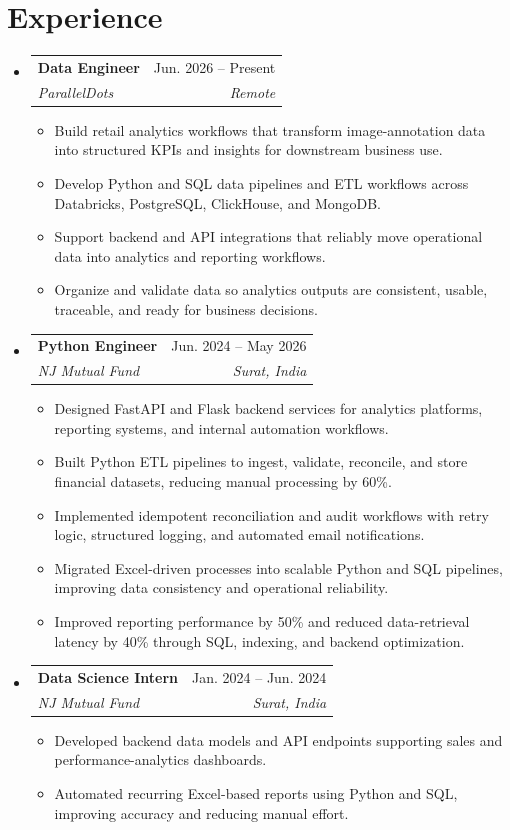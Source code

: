 \documentclass[letterpaper,10pt]{article}
\makeatletter
\newcommand{\resumeItem}[1]{\item\small{{#1 \vspace{-2pt}}}}
\newcommand{\resumeSubheading}[4]{
  \vspace{-2pt}\item
  \begin{tabular*}{0.97\textwidth}[t]{l@{\extracolsep{\fill}}r}
    \textbf{#1} & #2 \\
    \textit{\small#3} & \textit{\small #4} \\
  \end{tabular*}\vspace{-7pt}
}
\newcommand{\resumeSubHeadingListStart}{\begin{itemize}[leftmargin=0.15in, label={}]}
\newcommand{\resumeSubHeadingListEnd}{\end{itemize}}
\newcommand{\resumeItemListStart}{\begin{itemize}[leftmargin=0.18in]}
\newcommand{\resumeItemListEnd}{\end{itemize}\vspace{-5pt}}
\makeatother
\begin{document}
\section{Experience}
\resumeSubHeadingListStart
  \resumeSubheading
    {Data Engineer}{Jun. 2026 -- Present}
    {ParallelDots}{Remote}
    \resumeItemListStart
      \resumeItem{Build retail analytics workflows that transform image-annotation data into structured KPIs and insights for downstream business use.}
      \resumeItem{Develop Python and SQL data pipelines and ETL workflows across Databricks, PostgreSQL, ClickHouse, and MongoDB.}
      \resumeItem{Support backend and API integrations that reliably move operational data into analytics and reporting workflows.}
      \resumeItem{Organize and validate data so analytics outputs are consistent, usable, traceable, and ready for business decisions.}
    \resumeItemListEnd
  \resumeSubheading
    {Python Engineer}{Jun. 2024 -- May 2026}
    {NJ Mutual Fund}{Surat, India}
    \resumeItemListStart
      \resumeItem{Designed FastAPI and Flask backend services for analytics platforms, reporting systems, and internal automation workflows.}
      \resumeItem{Built Python ETL pipelines to ingest, validate, reconcile, and store financial datasets, reducing manual processing by 60\%.}
      \resumeItem{Implemented idempotent reconciliation and audit workflows with retry logic, structured logging, and automated email notifications.}
      \resumeItem{Migrated Excel-driven processes into scalable Python and SQL pipelines, improving data consistency and operational reliability.}
      \resumeItem{Improved reporting performance by 50\% and reduced data-retrieval latency by 40\% through SQL, indexing, and backend optimization.}
    \resumeItemListEnd
  \resumeSubheading
    {Data Science Intern}{Jan. 2024 -- Jun. 2024}
    {NJ Mutual Fund}{Surat, India}
    \resumeItemListStart
      \resumeItem{Developed backend data models and API endpoints supporting sales and performance-analytics dashboards.}
      \resumeItem{Automated recurring Excel-based reports using Python and SQL, improving accuracy and reducing manual effort.}
    \resumeItemListEnd
\resumeSubHeadingListEnd
\end{document}
